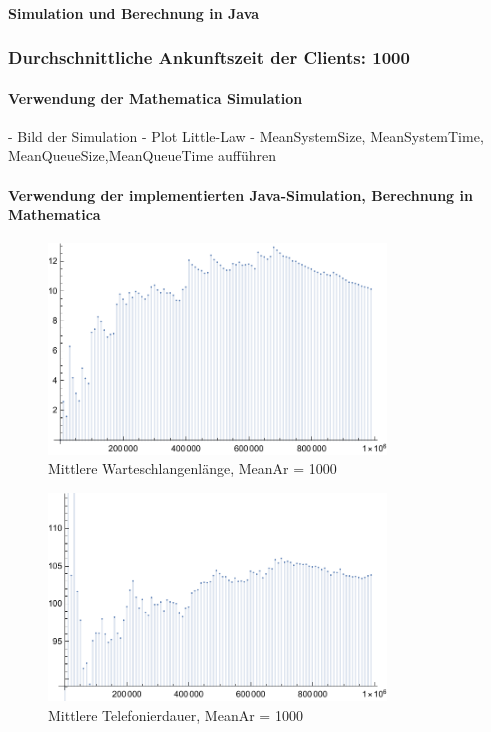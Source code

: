 \paragraph{Simulation und Berechnung in Java}


\subsubsection{Durchschnittliche Ankunftszeit der Clients: 1000}
\paragraph{Verwendung der Mathematica Simulation}
- Bild der Simulation 
- Plot Little-Law
- MeanSystemSize, MeanSystemTime, MeanQueueSize,MeanQueueTime aufführen
\paragraph{Verwendung der implementierten Java-Simulation, Berechnung in Mathematica}
\begin{figure}[htpb]
	\centering
	\includegraphics[width=0.8\textwidth]{abbildungen/auswertung1000/meanQueueTimePlot.pdf}
	\caption{Mittlere Warteschlangenlänge, MeanAr = 1000}
	\label{fig:meanQueueTime1000}
\end{figure}

\begin{figure}[htpb]
	\centering
	\includegraphics[width=0.8\textwidth]{abbildungen/auswertung1000/meanCallingTimePlot.pdf}
	\caption{Mittlere Telefonierdauer, MeanAr = 1000}
	\label{fig:meanCallingTime1000}
\end{figure}

